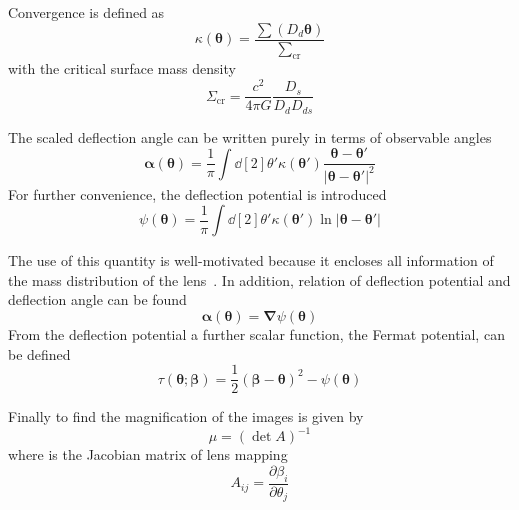 Convergence is defined as
\begin{equation}
\kappa(\pmb\theta)=\frac{\sum(D_{d} \pmb \theta)}{\sum_\text{cr}}
\label{Equ:KTheta}
\end{equation}
with the critical surface mass density~\cite{manual}
\begin{equation}
\Sigma_\text{cr}=\frac{c^2}{4\pi G}\frac{D_{s}}{D_{d}D_{ds}}
\label{SumCr}
\end{equation}

The scaled deflection angle can be written purely in terms of observable angles~\cite{manual}
\begin{equation}
\pmb\alpha(\pmb\theta)=\frac{1}{\pi}\int \dd[2]{\theta'} \kappa(\pmb{\theta}')\frac{\pmb\theta-\pmb\theta'}{| \pmb\theta -\pmb\theta'| ^2}
\label{ScaledDA}
\end{equation} 
For further convenience, the deflection potential is introduced~\cite{manual}
\begin{equation}
\psi(\pmb\theta)=\frac{1}{\pi}\int \dd[2]{\theta'} \kappa(\pmb\theta') \ln | \pmb\theta- \pmb\theta'| 
\label{psiTheta}
\end{equation}

The use of this quantity is well-motivated because it encloses all information of the mass distribution of the lens~\cite{manual}. In addition, relation of deflection potential and deflection angle can be found
\begin{equation}
\pmb\alpha(\pmb\theta)=\pmb\nabla\psi(\pmb\theta)
\label{Equ:AlphaTheta}
\end{equation}
From the deflection potential a further scalar function, the Fermat potential, can be defined~\cite{manual}
\begin{equation}
\tau(\pmb\theta; \pmb\beta)=\frac{1}{2}(\pmb\beta -\pmb\theta)^2 -\psi(\pmb\theta)
\label{Equ:Format}
\end{equation}

Finally to find the magnification of the images is given by~\cite{manual}
\begin{equation}
\mu =(\det A)^{-1}
\label{math:mag}
\end{equation}
where  is the Jacobian matrix of lens mapping
\begin{equation}
A_{ij}=\frac{\partial\beta_{i}}{\partial \theta_{j}}
\end{equation}\\

